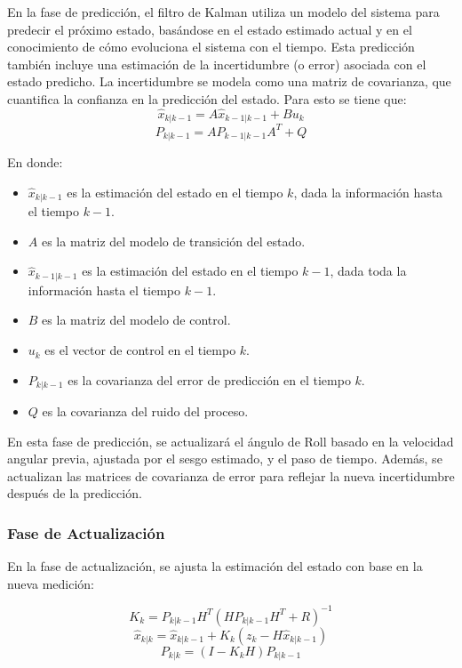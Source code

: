         En la fase de predicción, el filtro de Kalman utiliza un modelo del sistema para predecir el próximo estado, basándose en el estado estimado actual y en el conocimiento de cómo evoluciona el sistema con el tiempo. Esta predicción también incluye una estimación de la incertidumbre (o error) asociada con el estado predicho. La incertidumbre se modela como una matriz de covarianza, que cuantifica la confianza en la predicción del estado. Para esto se tiene que: \\

        \[
        \hat{x}_{k|k-1} = A\hat{x}_{k-1|k-1} + B u_k
        \]
        \[
        P_{k|k-1} = A P_{k-1|k-1} A^T + Q
        \]

        En donde:
        \begin{itemize}
            \item $\hat{x}_{k|k-1}$ es la estimación del estado en el tiempo $k$, dada la información hasta el tiempo $k-1$.
            \item $A$ es la matriz del modelo de transición del estado.
            \item $\hat{x}_{k-1|k-1}$ es la estimación del estado en el tiempo $k-1$, dada toda la información hasta el tiempo $k-1$.
            \item $B$ es la matriz del modelo de control.
            \item $u_k$ es el vector de control en el tiempo $k$.
            \item $P_{k|k-1}$ es la covarianza del error de predicción en el tiempo $k$.
            \item $Q$ es la covarianza del ruido del proceso.
        \end{itemize}

        En esta fase de predicción, se actualizará el ángulo de Roll basado en la velocidad angular previa, ajustada por el sesgo estimado, y el paso de tiempo. Además, se actualizan las matrices de covarianza de error para reflejar la nueva incertidumbre después de la predicción.

    \subsubsection{ Fase de Actualización}

        En la fase de actualización, se ajusta la estimación del estado con base en la nueva medición:

        \[
        K_k = P_{k|k-1} H^T (H P_{k|k-1} H^T + R)^{-1}
        \]
        \[
        \hat{x}_{k|k} = \hat{x}_{k|k-1} + K_k (z_k - H \hat{x}_{k|k-1})
        \]
        \[
        P_{k|k} = (I - K_k H) P_{k|k-1}
        \]

